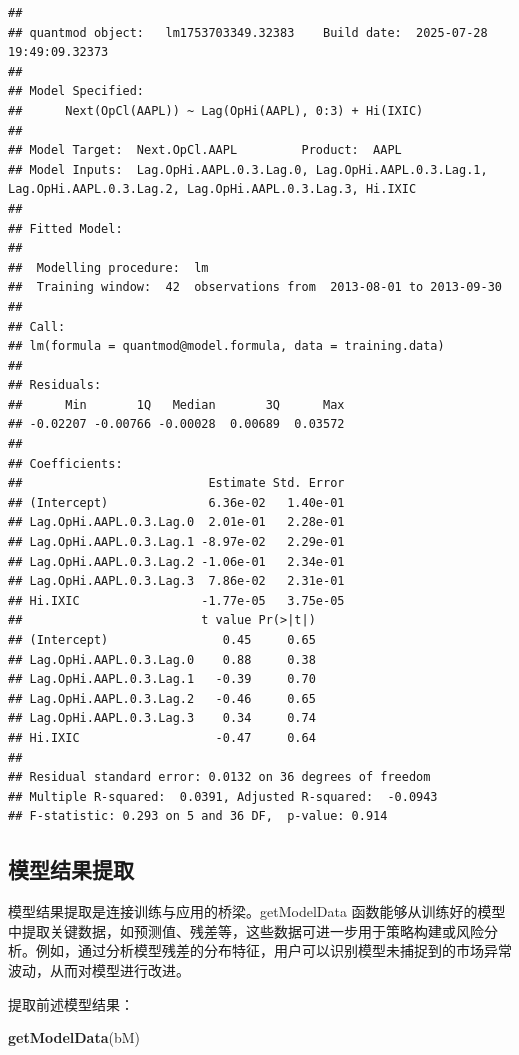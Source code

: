 \documentclass[]{ctexbook}
\newenvironment{Shaded}{\begin{snugshade}}{\end{snugshade}}
\newcommand{\FunctionTok}[1]{\textcolor[rgb]{0.13,0.29,0.53}{\textbf{#1}}}
\newcommand{\NormalTok}[1]{#1}
\begin{document}
\begin{verbatim}
## 
## quantmod object:   lm1753703349.32383    Build date:  2025-07-28 19:49:09.32373 
## 
## Model Specified: 
##      Next(OpCl(AAPL)) ~ Lag(OpHi(AAPL), 0:3) + Hi(IXIC) 
## 
## Model Target:  Next.OpCl.AAPL         Product:  AAPL 
## Model Inputs:  Lag.OpHi.AAPL.0.3.Lag.0, Lag.OpHi.AAPL.0.3.Lag.1, Lag.OpHi.AAPL.0.3.Lag.2, Lag.OpHi.AAPL.0.3.Lag.3, Hi.IXIC 
## 
## Fitted Model: 
## 
##  Modelling procedure:  lm 
##  Training window:  42  observations from  2013-08-01 to 2013-09-30
## 
## Call:
## lm(formula = quantmod@model.formula, data = training.data)
## 
## Residuals:
##      Min       1Q   Median       3Q      Max 
## -0.02207 -0.00766 -0.00028  0.00689  0.03572 
## 
## Coefficients:
##                          Estimate Std. Error
## (Intercept)              6.36e-02   1.40e-01
## Lag.OpHi.AAPL.0.3.Lag.0  2.01e-01   2.28e-01
## Lag.OpHi.AAPL.0.3.Lag.1 -8.97e-02   2.29e-01
## Lag.OpHi.AAPL.0.3.Lag.2 -1.06e-01   2.34e-01
## Lag.OpHi.AAPL.0.3.Lag.3  7.86e-02   2.31e-01
## Hi.IXIC                 -1.77e-05   3.75e-05
##                         t value Pr(>|t|)
## (Intercept)                0.45     0.65
## Lag.OpHi.AAPL.0.3.Lag.0    0.88     0.38
## Lag.OpHi.AAPL.0.3.Lag.1   -0.39     0.70
## Lag.OpHi.AAPL.0.3.Lag.2   -0.46     0.65
## Lag.OpHi.AAPL.0.3.Lag.3    0.34     0.74
## Hi.IXIC                   -0.47     0.64
## 
## Residual standard error: 0.0132 on 36 degrees of freedom
## Multiple R-squared:  0.0391, Adjusted R-squared:  -0.0943 
## F-statistic: 0.293 on 5 and 36 DF,  p-value: 0.914
\end{verbatim}

\subsection{模型结果提取}\label{ux6a21ux578bux7ed3ux679cux63d0ux53d6}

模型结果提取是连接训练与应用的桥梁。getModelData 函数能够从训练好的模型中提取关键数据，如预测值、残差等，这些数据可进一步用于策略构建或风险分析。例如，通过分析模型残差的分布特征，用户可以识别模型未捕捉到的市场异常波动，从而对模型进行改进。

提取前述模型结果：

\begin{Shaded}
\begin{Highlighting}[]
\FunctionTok{getModelData}\NormalTok{(bM)}
\end{Highlighting}
\end{Shaded}
\end{document}
